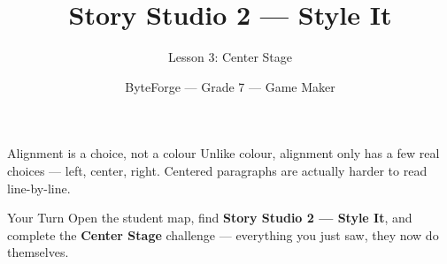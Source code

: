 \documentclass[aspectratio=169]{beamer}
\title{Story Studio 2 — Style It}
\subtitle{Lesson 3: Center Stage}
\author{ByteForge --- Grade 7 --- Game Maker}
\date{}
\begin{document}
\begin{frame}
    \titlepage
\end{frame}

\begin{frame}{Alignment is a choice, not a colour}
    \Large
    Unlike colour, alignment only has a few real choices — left, center, right. Centered paragraphs are actually harder to read line-by-line.
\end{frame}

\begin{frame}{Your Turn}
    \Large
    Open the student map, find \textbf{Story Studio 2 — Style It}, and complete
    the \textbf{Center Stage} challenge --- everything you just saw, they now do themselves.
\end{frame}
\end{document}
